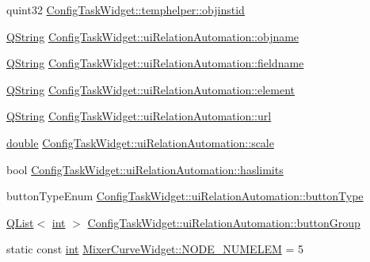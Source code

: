 \begin{DoxyCompactItemize}
\item 
quint32 \hyperlink{group___u_a_v_object_widget_utils_ga80a5419befd7432330b2ffb95368f4ed}{Config\-Task\-Widget\-::temphelper\-::objinstid}
\item 
\hyperlink{group___u_a_v_objects_plugin_gab9d252f49c333c94a72f97ce3105a32d}{Q\-String} \hyperlink{group___u_a_v_object_widget_utils_ga3a6899c9cfb56d74f0bf98300a156bc7}{Config\-Task\-Widget\-::ui\-Relation\-Automation\-::objname}
\item 
\hyperlink{group___u_a_v_objects_plugin_gab9d252f49c333c94a72f97ce3105a32d}{Q\-String} \hyperlink{group___u_a_v_object_widget_utils_ga727a26d7cef842f8e7cd274117a1153d}{Config\-Task\-Widget\-::ui\-Relation\-Automation\-::fieldname}
\item 
\hyperlink{group___u_a_v_objects_plugin_gab9d252f49c333c94a72f97ce3105a32d}{Q\-String} \hyperlink{group___u_a_v_object_widget_utils_gabe7df1fc4c590dc11cc6f80698fc125c}{Config\-Task\-Widget\-::ui\-Relation\-Automation\-::element}
\item 
\hyperlink{group___u_a_v_objects_plugin_gab9d252f49c333c94a72f97ce3105a32d}{Q\-String} \hyperlink{group___u_a_v_object_widget_utils_ga14b83b3a1113a21d03ee1b3e8967b7e7}{Config\-Task\-Widget\-::ui\-Relation\-Automation\-::url}
\item 
\hyperlink{_super_l_u_support_8h_a8956b2b9f49bf918deed98379d159ca7}{double} \hyperlink{group___u_a_v_object_widget_utils_gafddb00770c074c3ce12d1699813a4d30}{Config\-Task\-Widget\-::ui\-Relation\-Automation\-::scale}
\item 
bool \hyperlink{group___u_a_v_object_widget_utils_ga73f9beb614502506b14c6b5d235b9d44}{Config\-Task\-Widget\-::ui\-Relation\-Automation\-::haslimits}
\item 
button\-Type\-Enum \hyperlink{group___u_a_v_object_widget_utils_gac8fcf738efe2855fbf1c7a810a20cffd}{Config\-Task\-Widget\-::ui\-Relation\-Automation\-::button\-Type}
\item 
\hyperlink{class_q_list}{Q\-List}$<$ \hyperlink{ioapi_8h_a787fa3cf048117ba7123753c1e74fcd6}{int} $>$ \hyperlink{group___u_a_v_object_widget_utils_ga915cb6bdf9aff1b607f8917b6f665fbd}{Config\-Task\-Widget\-::ui\-Relation\-Automation\-::button\-Group}
\item 
static const \hyperlink{ioapi_8h_a787fa3cf048117ba7123753c1e74fcd6}{int} \hyperlink{group___u_a_v_object_widget_utils_ga359d5a2efb6966cba1d78bbdb2e7759d}{Mixer\-Curve\-Widget\-::\-N\-O\-D\-E\-\_\-\-N\-U\-M\-E\-L\-E\-M} = 5
\end{DoxyCompactItemize}
